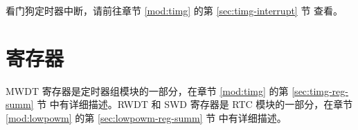 \documentclass[main\_\_CN.tex]{subfiles}
\begin{document}
看门狗定时器中断，请前往章节 \ref{mod:timg} \textit{} 的第 \ref{sec:timg-interrupt} 节 \textit{} 查看。



\section{寄存器}
MWDT 寄存器是定时器组模块的一部分，在章节 \ref{mod:timg} \textit{} 的第 \ref{sec:timg-reg-summ} 节 \textit{} 中有详细描述。RWDT 和 SWD 寄存器是 RTC 模块的一部分，在章节 \ref{mod:lowpowm} \textit{} 的第 \ref{sec:lowpowm-reg-summ} 节 \textit{} 中有详细描述。
\end{document}
